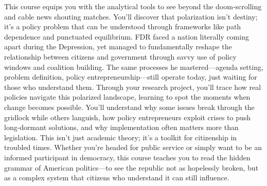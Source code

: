 \documentclass[12pt]{article}     %
\begin{document}
  This course equips you with the analytical tools to see beyond the doom-scrolling and cable news shouting matches. You'll discover that polarization isn't destiny; it's a policy problem that can be understood through frameworks like path dependence and punctuated equilibrium. FDR faced a nation literally coming apart during the Depression, yet managed to fundamentally reshape the relationship between citizens and government through savvy use of policy windows and coalition building. The same processes he mastered---agenda setting, problem definition, policy entrepreneurship---still operate today, just waiting for those who understand them. Through your research project, you'll trace how real policies navigate this polarized landscape, learning to spot the moments when change becomes possible. You'll understand why some issues break through the gridlock while others languish, how policy entrepreneurs exploit crises to push long-dormant solutions, and why implementation often matters more than legislation. This isn't just academic theory; it's a toolkit for citizenship in troubled times. Whether you're headed for public service or simply want to be an informed participant in democracy, this course teaches you to read the hidden grammar of American politics---to see the republic not as hopelessly broken, but as a complex system that citizens who understand it can still influence.
\end{document}
